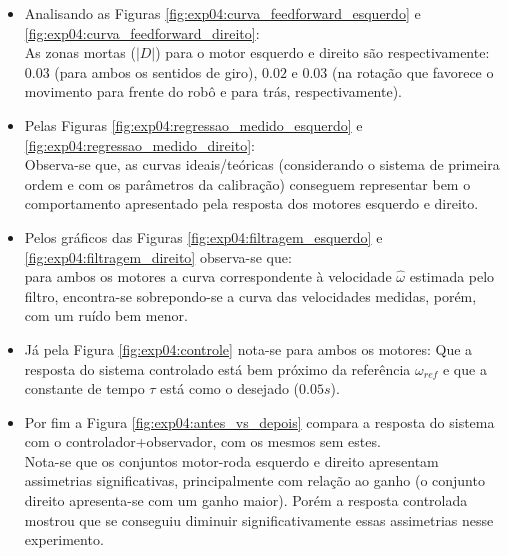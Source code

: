 \begin{itemize}
    \item Analisando as Figuras \ref{fig:exp04:curva_feedforward_esquerdo} e \ref{fig:exp04:curva_feedforward_direito}:\\
        As zonas mortas ($|D|$) para o motor esquerdo e direito são respectivamente: $0.03$ (para ambos os sentidos de giro), $0.02$ e $0.03$ (na rotação que favorece o movimento para frente do robô e para trás, respectivamente).
    \item Pelas Figuras \ref{fig:exp04:regressao_medido_esquerdo} e \ref{fig:exp04:regressao_medido_direito}:\\
        Observa-se que, as curvas ideais/teóricas (considerando o sistema de primeira ordem e com os parâmetros da calibração) conseguem representar bem o comportamento apresentado pela resposta dos motores esquerdo e direito.
    \item Pelos gráficos das Figuras \ref{fig:exp04:filtragem_esquerdo} e \ref{fig:exp04:filtragem_direito} observa-se que:\\
        para ambos os motores a curva correspondente à velocidade $\hat{\omega}$ estimada pelo filtro, encontra-se sobrepondo-se a curva das velocidades medidas, porém, com um ruído bem menor.
    \item Já pela Figura \ref{fig:exp04:controle} nota-se para ambos os motores:
        Que a resposta do sistema controlado está bem próximo da referência $\omega_{ref}$ e que a constante de tempo $\tau$ está como o desejado ($0.05s$).
    \item Por fim a Figura \ref{fig:exp04:antes_vs_depois} compara a resposta do sistema com o controlador+observador, com os mesmos sem estes. \\
        Nota-se que os conjuntos motor-roda esquerdo e direito apresentam assimetrias significativas, principalmente com relação ao  ganho (o conjunto direito apresenta-se com um ganho maior). Porém a resposta controlada mostrou que se conseguiu diminuir significativamente essas assimetrias nesse experimento.
\end{itemize}